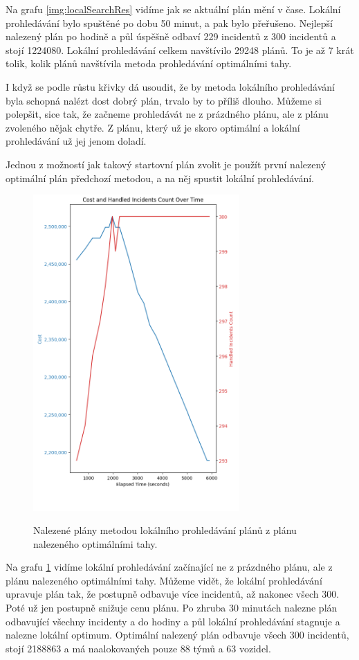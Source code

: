 Na grafu \ref{img:localSearchRes} vidíme jak se aktuální plán mění v čase.
Lokální prohledávání bylo spuštěné po dobu 50 minut, a pak bylo přeřušeno. 
Nejlepší nalezený plán po hodině a půl úspěšně odbaví 229 incidentů z 300 incidentů a stojí 1224080.
Lokální prohledávání celkem navštívilo 29248 plánů. To je až 7 krát tolik, kolik plánů navštívila metoda prohledávání optimálními tahy.

I když se podle růstu křivky dá usoudit, že by metoda lokálního prohledávání byla schopná nalézt dost dobrý plán, trvalo by to příliš dlouho.
Můžeme si polepšit, sice tak, že začneme prohledávát ne z prázdného plánu, ale z plánu zvoleného nějak chytře.
Z plánu, který už je skoro optimální a lokální prohledávání už jej jenom doladí.

Jednou z možností jak takový startovní plán zvolit je použít první nalezený optimální plán předchozí metodou, a na něj spustit lokální prohledávání.

\begin{figure}[H]
  \caption{Nalezené plány metodou lokálního prohledávání plánů z plánu nalezeného optimálními tahy.}
  \includegraphics[width=0.7\textwidth,height=0.9\textwidth]{img/plots/localSearch_fromOptimal.png}
  \centering
  \label{img:hybrid}
\end{figure}

Na grafu \ref{img:hybrid} vidíme lokální prohledávání začínající ne z prázdného plánu, ale z plánu nalezeného optimálními tahy.
Můžeme vidět, že lokální prohledávání upravuje plán tak, že postupně odbavuje více incidentů, až nakonec všech 300. Poté už jen postupně snižuje cenu plánu.
Po zhruba 30 minutách nalezne plán odbavující všechny incidenty a do hodiny a půl lokální prohledávání stagnuje a nalezne lokální optimum.
Optimální nalezený plán odbavuje všech 300 incidentů, stojí 2188863 a má naalokovaných pouze 88 týmů a 63 vozidel.

